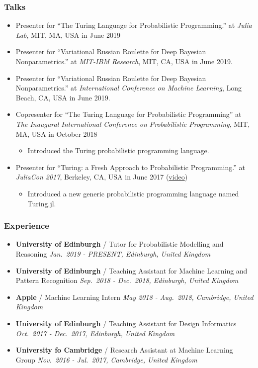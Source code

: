 \documentclass[11pt, a4paper]{article}
\providecommand{\tightlist}{%
  \setlength{\itemsep}{0pt}\setlength{\parskip}{0pt}}
\begin{document}
\begin{raggedright}
\subsubsection{Talks}

\begin{itemize}
\tightlist
\item
  Presenter for ``The Turing Language for Probabilistic Programming.''
  at \emph{Julia Lab}, MIT, MA, USA in June 2019
\item
  Presenter for ``Variational Russian Roulette for Deep Bayesian
  Nonparametrics.'' at \emph{MIT-IBM Research}, MIT, CA, USA in June
  2019.
\item
  Presenter for ``Variational Russian Roulette for Deep Bayesian
  Nonparametrics.'' at \emph{International Conference on Machine
  Learning}, Long Beach, CA, USA in June 2019.
\item
  Copresenter for ``The Turing Language for Probabilistic Programming''
  at \emph{The Inaugural International Conference on Probabilistic
  Programming}, MIT, MA, USA in October 2018

  \begin{itemize}
  \tightlist
  \item
    Introduced the Turing probabilistic programming language.
  \end{itemize}
\item
  Presenter for ``Turing: a Fresh Approach to Probabilistic
  Programming.'' at \emph{JuliaCon 2017}, Berkeley, CA, USA in June 2017
  (\href{https://www.youtube.com/watch?v=DJWNQg7uuCg}{video})

  \begin{itemize}
  \tightlist
  \item
    Introduced a new generic probabilistic programming language named
    Turing.jl.
  \end{itemize}
\end{itemize}

\subsubsection{Experience}

\begin{itemize}
\tightlist
\item
  \textbf{University of Edinburgh} / Tutor for Probabilistic Modelling
  and Reasoning \emph{Jan.~2019 - PRESENT, Edinburgh, United Kingdom}
\item
  \textbf{University of Edinburgh} / Teaching Assistant for Machine
  Learning and Pattern Recognition \emph{Sep.~2018 - Dec.~2018,
  Edinburgh, United Kingdom}
\item
  \textbf{Apple} / Machine Learning Intern \emph{May 2018 - Aug.~2018,
  Cambridge, United Kingdom}
\item
  \textbf{University of Edinburgh} / Teaching Assistant for Design
  Informatics \emph{Oct.~2017 - Dec.~2017, Edinburgh, United Kingdom}
\item
  \textbf{University fo Cambridge} / Research Assistant at Machine
  Learning Group \emph{Nov.~2016 - Jul.~2017, Cambridge, United Kingdom}
\end{itemize}


\end{raggedright}
\end{document}
